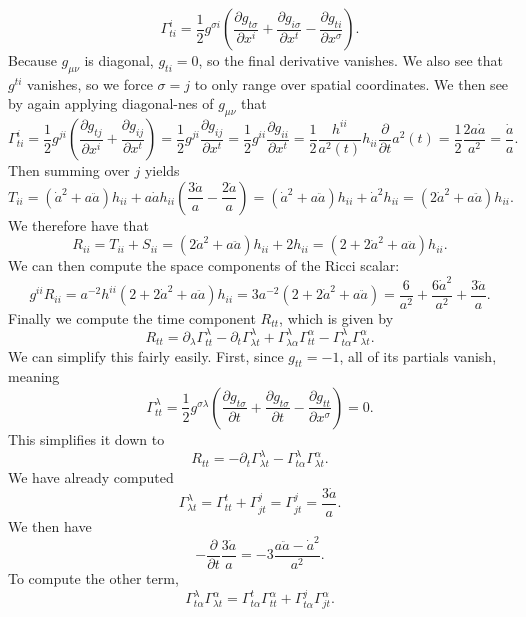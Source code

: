 \documentclass[11pt, letterpaper]{article}
\begin{document}
\[
	\Gamma ^i_{ti} =\frac{1}{2} g^{\sigma i} \left( \frac{\partial g_{t\sigma } }{\partial x^i} +\frac{\partial g_{i\sigma } }{\partial x^t} -\frac{\partial g_{ti} }{\partial x^\sigma }  \right) 
.\]
Because $g_{\mu \nu } $ is diagonal, $g_{ti} =0$, so the final derivative vanishes. We also see that $g^{ti} $ vanishes, so we force $\sigma =j$ to only range over spatial coordinates. We then see by again applying diagonal-nes of $g_{\mu \nu } $ that
\[
	\Gamma ^i_{ti} =\frac{1}{2} g^{ji} \left( \frac{\partial g_{tj} }{\partial x^i} +\frac{\partial g_{ij} }{\partial x^t}  \right) =\frac{1}{2} g^{ji} \frac{\partial g_{ij} }{\partial x^t} = \frac{1}{2} g^{ii} \frac{\partial g_{ii} }{\partial x^t} =\frac{1}{2} \frac{h^{ii} }{a^2(t)} h_{ii} \frac{\partial }{\partial t} a^2(t)=\frac{1}{2} \frac{2a \dot{a} }{a^2} =\frac{\dot{a} }{a}
.\]
Then summing over $j$ yields
\[
	T_{ii} =\left( \dot{a} ^2 + a \ddot{a}  \right) h_{ii} + a \dot{a} h_{ii} \left( \frac{3 \dot{a} }{a} -\frac{2 \dot{a} }{a}  \right) = \left( \dot{a} ^2 + a \ddot{a}  \right) h_{ii} + \dot{a} ^2 h_{ii} = \left( 2 \dot{a} ^2 + a \ddot{a}  \right) h_{ii} 
.\]
We therefore have that
\[
	R_{ii} =T_{ii} +S_{ii} =\left( 2 \dot{a} ^2+a \ddot{a}  \right) h_{ii} +2h_{ii} =\left( 2+2 \dot{a} ^2 + a \ddot{a}  \right) h_{ii} 
.\]
We can then compute the space components of the Ricci scalar:
\[
	g^{ii} R_{ii} =a^{-2} h^{ii} \left( 2 + 2 \dot{a} ^2 + a \ddot{a}  \right) h_{ii} =3a^{-2}\left( 2 + 2\dot{a}^2 + a\ddot{a}  \right) =\frac{6}{a^2} +\frac{6 \dot{a} ^2}{a^2} +\frac{3 \ddot{a} }{a} 
.\]
Finally we compute the time component $R_{tt} $, which is given by
\[
	R_{tt} =\partial _\lambda \Gamma ^\lambda _{tt} -\partial _t \Gamma ^\lambda _{\lambda t} +\Gamma ^\lambda _{\lambda \alpha } \Gamma ^\alpha _{tt} -\Gamma ^\lambda _{t\alpha } \Gamma ^\alpha _{\lambda t} 
.\]
We can simplify this fairly easily. First, since $g_{tt} =-1$, all of its partials vanish, meaning
\[
	\Gamma^\lambda _{tt} =\frac{1}{2} g^{\sigma \lambda } \left( \frac{\partial g_{t\sigma } }{\partial t} +\frac{\partial g_{t\sigma } }{\partial t} -\frac{\partial g_{tt} }{\partial x^\sigma }  \right) =0
.\]
This simplifies it down to
\[
	R_{tt} =-\partial _t \Gamma ^\lambda _{\lambda t} -\Gamma ^\lambda _{t\alpha } \Gamma ^\alpha _{\lambda t} 
.\]
We have already computed
\[
	\Gamma ^\lambda_{\lambda t} =\Gamma ^t_{tt} +\Gamma ^j_{jt} =\Gamma ^j_{jt} =\frac{3 \dot{a} }{a} 
.\]
We then have
\[
	-\frac{\partial }{\partial t} \frac{3 \dot{a} }{a} =-3\frac{a \ddot{a} -\dot{a} ^2}{a^2} 
.\]
To compute the other term,
\[
	\Gamma ^\lambda _{t\alpha } \Gamma ^\alpha _{\lambda t} =\Gamma ^t_{t\alpha } \Gamma ^\alpha_{tt}+\Gamma ^j_{t\alpha } \Gamma ^\alpha _{jt} 
.\]
\end{document}
